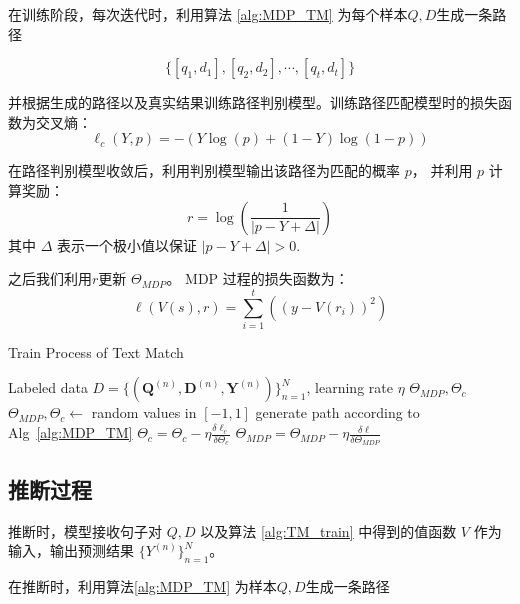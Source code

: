 在训练阶段，每次迭代时，利用算法 \ref{alg:MDP_TM} 为每个样本$Q, D$生成一条路径

$$\{[q_1, d_1], [q_2, d_2], \cdots, [q_t, d_t]\}$$

并根据生成的路径以及真实结果训练路径判别模型。训练路径匹配模型时的损失函数为交叉熵：
\begin{equation}
\label{eq:classify_model}
\ell_c(Y, p) = -(Y\log(p) + (1-Y)\log(1-p))
\end{equation}

在路径判别模型收敛后，利用判别模型输出该路径为匹配的概率 $p$， 并利用 $p$ 计算奖励：
$$
r = \log(\frac{1}{|p-Y+\Delta|})
$$
其中 $\Delta$ 表示一个极小值以保证 $|p-Y+\Delta| > 0$.

之后我们利用$r$更新 $\Theta_{MDP}$。 MDP 过程的损失函数为：
\begin{equation}
\label{eq:MDP_model}
\ell(V(s), r) = \sum_{i=1}^t\left((y - V(r_i))^2\right)
\end{equation}

\begin{algorithm}[!htbp]
    \small
    \caption{Train Process of Text Match}\label{alg:TM_train}
    \renewcommand{\algorithmicrequire}{\textbf{Input:}}
    \renewcommand{\algorithmicensure}{\textbf{Output:}}
    \begin{algorithmic}
        \Require Labeled data $D=\{ (\mathbf{Q}^{(n)}, \mathbf{D}^{(n)}, \mathbf{Y}^{(n)})\}_{n=1}^N$, learning rate $\eta$
        \Ensure $\Theta_{MDP}, \Theta_{c}$
        \State {} $\Theta_{MDP}, \Theta_{c} \leftarrow$ random values in $[-1, 1]$
          \State generate path according to Alg~\ref{alg:MDP_TM}
            \State $\Theta_{c} = \Theta_{c} - \eta \frac{\delta \ell_c}{\delta \Theta_{c}}$ 
          \EndWhile
          \State $\Theta_{MDP} = \Theta_{MDP} - \eta \frac{\delta \ell}{\delta \Theta_{MDP}}$ 
        \EndWhile
    \end{algorithmic}
\end{algorithm}

\subsection{推断过程}
推断时，模型接收句子对 $Q, D$ 以及算法 \ref{alg:TM_train} 中得到的值函数 $V$ 作为输入，输出预测结果 $\{Y^{(n)}\}_{n=1}^N$。

在推断时，利用算法\ref{alg:MDP_TM} 为样本$Q, D$生成一条路径

